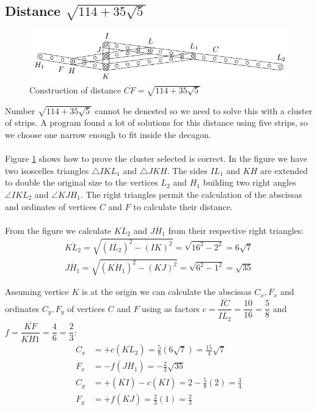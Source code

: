 \documentclass[11pt]{article}
\begin{document}
\subsection{Distance $\sqrt{114+35\sqrt5}$}

\begin{figure}[h]
 \centering
 \includegraphics[scale=1.3]{10/cluster10a}
 \caption{Construction of distance $\overline{CF} = \sqrt{114+35\sqrt5}$}
 \label{fig:cluster10a}
\end{figure}

Number $\sqrt{114 + 35\sqrt5}$ cannot be denested so we need to solve this with a cluster of strips. A program found a lot of solutions for this distance using five strips, so we choose one narrow enough to fit inside the decagon.
\\\\
Figure \ref{fig:cluster10a} shows how to prove the cluster selected is correct. In the figure we have two isoscelles triangles $\triangle{IKL_1}$ and $\triangle{JKH}$. The sides $IL_1$ and $KH$ are extended to double the original size to the vertices $L_2$ and $H_1$ building two right angles $\angle{IKL_2}$ and $\angle{KJH_1}$. The right triangles permit the calculation of the abscissas and ordinates of vertices $C$ and $F$ to calculate their distance.
\\\\
From the figure we calculate $\overline{KL_2}$ and $\overline{JH_1}$ from their respective right triangles:
\begin{align}
\overline{KL_2} = \sqrt{(\overline{IL_2})^2 - (IK)^2} = \sqrt{16^2 - 2^2} = 6\sqrt7\\
\overline{JH_1} = \sqrt{(\overline{KH_1})^2 - (KJ)^2} = \sqrt{6^2 - 1^2} = \sqrt{35}
\end{align}

Assuming vertice $K$ is at the origin we can calculate the abscissas $C_x,F_x$ and ordinates $C_y,F_y$ of vertices $C$ and $F$ using as factors $c = \dfrac{\overline{IC}}{\overline{IL_2}} = \dfrac{10}{16} = \dfrac{5}8$ and $f = \dfrac{\overline{KF}}{\overline{KH1}}=\dfrac{4}6 = \dfrac{2}3$:
\begin{align}
C_x &= +c(\overline{KL_2}) = \frac{5}{8}(6\sqrt7) = \frac{15}{4}\sqrt7\\
F_x &= -f(\overline{JH_1}) = -\frac{2}{3}\sqrt{35}\\
C_y &= +(\overline{KI}) - c(\overline{KI}) = 2 - \frac{5}{8}(2) = \frac{3}4\\
F_y &= +f(\overline{KJ}) = \frac{2}{3}(1) = \frac{2}3
\end{align}
\end{document}
